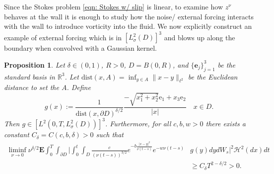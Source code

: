 \documentclass[11pt, reqno]{article}
\def\R{{\mathbb R}} %
\newtheorem{proposition}[theorem]{Proposition}
\def\ds{\displaystyle}
\def\E{\mathbf{E}}
\def\H{{\mathcal H}}
\def\dist{\mathrm{dist}}
\begin{document}
Since the Stokes problem \ref{eqn: Stokes w/ slip} is linear, to examine how $z^\nu$ behaves at the wall it is enough to study how the noise/ external forcing interacts with the wall to introduce vorticity into the fluid. We now explicitly construct an example of external forcing which is in $[L_\sigma^2(D)]^3$ and blows up along the boundary when convolved with a Gaussian kernel. 
\begin{proposition}\label{proposition: choice of forcing}
    Let $\delta \in (0,1)$, $R > 0$, $D = B(0,R)$, and $\{\mathbf{e}_j\}_{j=1}^3$ be the standard basis in $\R^3$. Let $\dist(x, A) = \ds\inf_{y \in A}\|x-y\|_{\ell^2}$ be the Euclidean distance to set the $A$. 
    Define
    \[
        g(x) := \frac{1}{\dist(x, \partial D)^{\delta/2}}\frac{-\sqrt{x_1^2 + x_2^2}\mathrm{e}_1 + x_3\mathrm{e}_2}{|x|} \quad x \in D.
    \]
    Then $g \in [L^2(0,T, L_\sigma^2(D))]^3$.
    Furthermore, for all $c,b,w > 0$ there exists a constant $C_\delta = C(c,b,\delta) >  0$ such that
    \begin{align*}
        \liminf_{\nu \to 0}\nu^{\delta/2}\E\int_0^T\int_{\partial D}\Big|\int_0^t\int_D \frac{c}{(\nu (t-s))^{3/2}}e^{-b\frac{|x-y|^2}{\nu (t-s)}}e^{-w\nu (t-s)}&g(y)dydW_s\Big|^2\H^2(dx)dt\\
        &\geq C_\delta T^{2-\delta/2} > 0.
    \end{align*}
\end{proposition}
\end{document}
